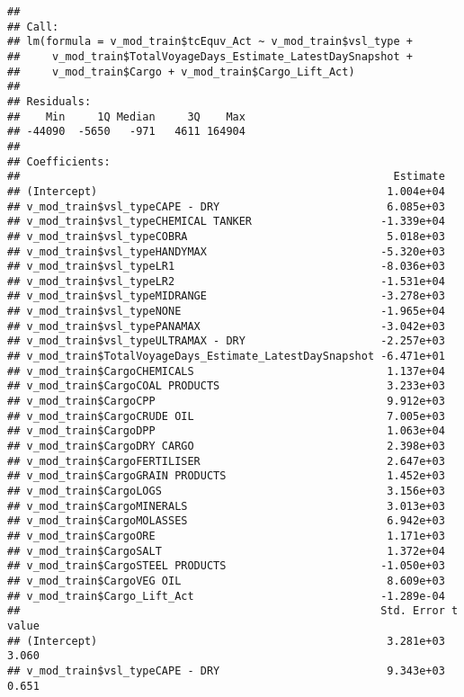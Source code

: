 \documentclass[]{article}
\begin{document}
\begin{verbatim}
## 
## Call:
## lm(formula = v_mod_train$tcEquv_Act ~ v_mod_train$vsl_type + 
##     v_mod_train$TotalVoyageDays_Estimate_LatestDaySnapshot + 
##     v_mod_train$Cargo + v_mod_train$Cargo_Lift_Act)
## 
## Residuals:
##    Min     1Q Median     3Q    Max 
## -44090  -5650   -971   4611 164904 
## 
## Coefficients:
##                                                          Estimate
## (Intercept)                                             1.004e+04
## v_mod_train$vsl_typeCAPE - DRY                          6.085e+03
## v_mod_train$vsl_typeCHEMICAL TANKER                    -1.339e+04
## v_mod_train$vsl_typeCOBRA                               5.018e+03
## v_mod_train$vsl_typeHANDYMAX                           -5.320e+03
## v_mod_train$vsl_typeLR1                                -8.036e+03
## v_mod_train$vsl_typeLR2                                -1.531e+04
## v_mod_train$vsl_typeMIDRANGE                           -3.278e+03
## v_mod_train$vsl_typeNONE                               -1.965e+04
## v_mod_train$vsl_typePANAMAX                            -3.042e+03
## v_mod_train$vsl_typeULTRAMAX - DRY                     -2.257e+03
## v_mod_train$TotalVoyageDays_Estimate_LatestDaySnapshot -6.471e+01
## v_mod_train$CargoCHEMICALS                              1.137e+04
## v_mod_train$CargoCOAL PRODUCTS                          3.233e+03
## v_mod_train$CargoCPP                                    9.912e+03
## v_mod_train$CargoCRUDE OIL                              7.005e+03
## v_mod_train$CargoDPP                                    1.063e+04
## v_mod_train$CargoDRY CARGO                              2.398e+03
## v_mod_train$CargoFERTILISER                             2.647e+03
## v_mod_train$CargoGRAIN PRODUCTS                         1.452e+03
## v_mod_train$CargoLOGS                                   3.156e+03
## v_mod_train$CargoMINERALS                               3.013e+03
## v_mod_train$CargoMOLASSES                               6.942e+03
## v_mod_train$CargoORE                                    1.171e+03
## v_mod_train$CargoSALT                                   1.372e+04
## v_mod_train$CargoSTEEL PRODUCTS                        -1.050e+03
## v_mod_train$CargoVEG OIL                                8.609e+03
## v_mod_train$Cargo_Lift_Act                             -1.289e-04
##                                                        Std. Error t value
## (Intercept)                                             3.281e+03   3.060
## v_mod_train$vsl_typeCAPE - DRY                          9.343e+03   0.651

\end{verbatim}
\end{document}
